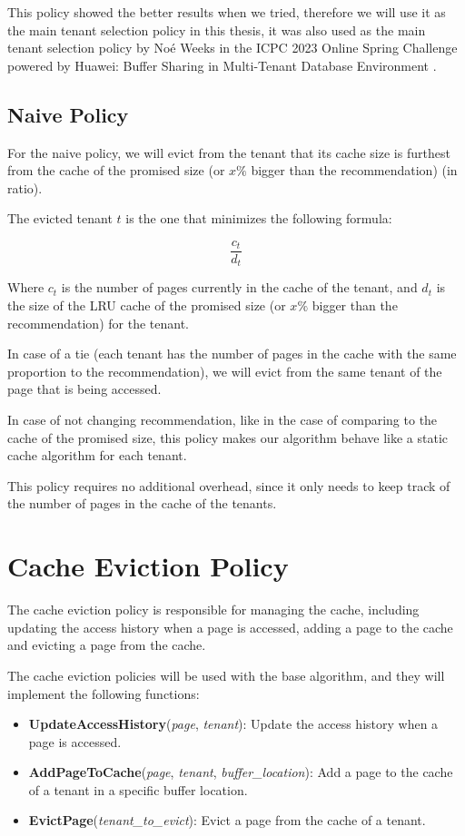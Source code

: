 This policy showed the better results when we tried, therefore we will use it as the main 
tenant selection policy in this thesis, it was also used as the main tenant selection policy
by Noé Weeks \cite{noe-weeks-comments} in the ICPC 2023 Online Spring Challenge powered by Huawei: Buffer Sharing in
Multi-Tenant Database Environment \cite{huawei-challenge}.

\subsection{Naive Policy}

For the naive policy, we will evict from the tenant that its cache size is furthest
from the cache of the promised size (or $x\%$ bigger than the recommendation) (in ratio).

The evicted tenant $t$ is the one that minimizes the following formula:

$$
\frac{ c_t }{ d_t }
$$

Where $c_t$ is the number of pages currently in the cache of the tenant, and
$d_t$ is the size of the LRU cache of the promised size (or $x\%$ bigger than
the recommendation) for the tenant.

In case of a tie (each tenant has the number of pages in the cache with the same 
proportion to the recommendation), we will evict from the same tenant of the page that 
is being accessed.


In case of not changing recommendation, like in the case of comparing to the cache of
the promised size, this policy makes our algorithm behave like a static cache algorithm
for each tenant.

This policy requires no additional overhead, since it only needs to keep track of the
number of pages in the cache of the tenants.

\section{Cache Eviction Policy}

The cache eviction policy is responsible for managing the cache, including updating the
access history when a page is accessed, adding a page to the cache and evicting a page
from the cache.

The cache eviction policies will be used with the base algorithm, and they will implement
the following functions:

\begin{itemize}
    \item \textbf{UpdateAccessHistory}(\textit{page}, \textit{tenant}): Update the access history when a page is accessed.
    \item \textbf{AddPageToCache}(\textit{page}, \textit{tenant}, \textit{buffer\_location}): Add a page to the cache of a tenant in a specific buffer location.
    \item \textbf{EvictPage}(\textit{tenant\_to\_evict}): Evict a page from the cache of a tenant.
\end{itemize}

